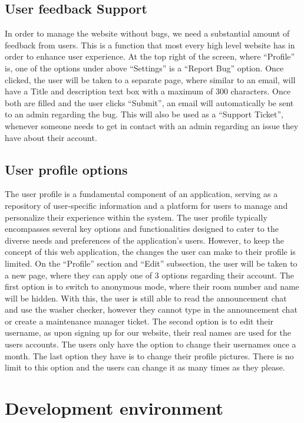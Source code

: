 \documentclass[conference]{IEEEtran}
\begin{document}
\subsection{User feedback Support}
In order to manage the website without bugs, we need a substantial amount of feedback from users. This is a function that most every high level website has in order to enhance user experience. At the top right of the screen, where “Profile” is, one of the options under above “Settings” is a “Report Bug” option. Once clicked, the user will be taken to a separate page, where similar to an email, will have a Title and description text box with a maximum of 300 characters. Once both are filled and the user clicks “Submit”, an email will automatically be sent to an admin regarding the bug. This will also be used as a “Support Ticket”, whenever someone needs to get in contact with an admin regarding an issue they have about their account.
\subsection{User profile options}
The user profile is a fundamental component of an application, serving as a repository of user-specific information and a platform for users to manage and personalize their experience within the system. The user profile typically encompasses several key options and functionalities designed to cater to the diverse needs and preferences of the application's users. However, to keep the concept of this web application, the changes the user can make to their profile is limited. On the “Profile” section and “Edit” subsection, the user will be taken to a new page, where they can apply one of 3 options regarding their account. The first option is to switch to anonymous mode, where their room number and name will be hidden. With this, the user is still able to read the announcement chat and use the washer checker, however they cannot type in the announcement chat or create a maintenance manager ticket. The second option is to edit their username, as upon signing up for our website, their real names are used for the users accounts. The users only have the option to change their usernames once a month. The last option they have is to change their profile pictures. There is no limit to this option and the users can change it as many times as they please.


\section{Development environment}
\end{document}
